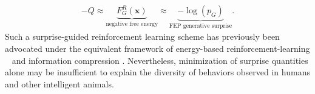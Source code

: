 \documentclass[10pt,letterpaper]{article}
\def\z{\mathbf{z}}
\def\x{\mathbf{x}}
\begin{document}
\begin{eqnarray*}
  -Q \approx \underbrace{F^R_G(\x)}_{\text{negative free energy}} \approx \underbrace{-\log (p_G)}_{\text{FEP generative surprise}}.
    \end{eqnarray*}
Such a surprise-guided reinforcement learning scheme has previously been advocated
under the equivalent framework of energy-based reinforcement-learning
~\citep{sallans2004,elfwing2016free} and information compression \citep{schmidhuber2010,mohamed2015}.
Nevertheless, minimization of surprise quantities alone
may be insufficient to explain the diversity of behaviors observed in humans and other intelligent animals.

\end{document}
